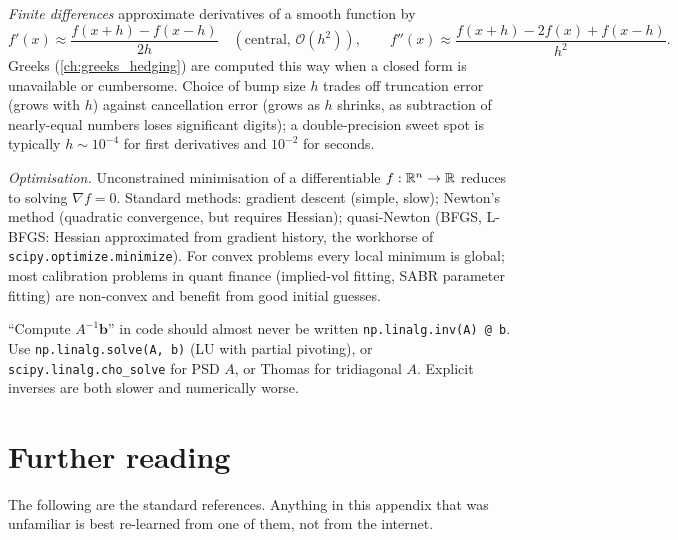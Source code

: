 \emph{Finite differences} approximate derivatives of a smooth function
by
\[
f'(x) \approx \frac{f(x+h) - f(x-h)}{2h} \quad (\text{central, } \mathcal{O}(h^2)),
\qquad
f''(x) \approx \frac{f(x+h) - 2f(x) + f(x-h)}{h^2}.
\]
Greeks (\cref{ch:greeks_hedging}) are computed this way when a
closed form is unavailable or cumbersome. Choice of bump size $h$
trades off truncation error (grows with $h$) against cancellation
error (grows as $h$ shrinks, as subtraction of nearly-equal numbers
loses significant digits); a double-precision sweet spot is typically
$h \sim 10^{-4}$ for first derivatives and $10^{-2}$ for seconds.

\emph{Optimisation.} Unconstrained minimisation of a differentiable
$f : \mathbb{R}^n \to \mathbb{R}$ reduces to solving $\nabla f = 0$. Standard methods:
gradient descent (simple, slow); Newton's method (quadratic convergence,
but requires Hessian); quasi-Newton (BFGS, L-BFGS: Hessian approximated
from gradient history, the workhorse of \verb|scipy.optimize.minimize|).
For convex problems every local minimum is global; most calibration
problems in quant finance (implied-vol fitting, SABR parameter fitting)
are non-convex and benefit from good initial guesses.

\begin{pitfallbox}
``Compute $A^{-1}\bm{b}$'' in code should almost never be written
\verb|np.linalg.inv(A) @ b|. Use \verb|np.linalg.solve(A, b)| (LU with
partial pivoting), or \verb|scipy.linalg.cho_solve| for PSD $A$, or
Thomas for tridiagonal $A$. Explicit inverses are both slower and
numerically worse.
\end{pitfallbox}

\section{Further reading}
\label{sec:app_math_refs}

The following are the standard references. Anything in this appendix
that was unfamiliar is best re-learned from one of them, not from the
internet.

